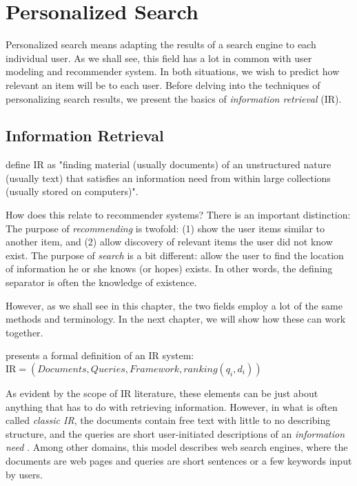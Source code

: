 \section{Personalized Search}
\label{sec:search}

Personalized search means adapting the results of a search engine to each individual user.
As we shall see, this field has a lot in common with user modeling and recommender system.
In both situations, we wish to predict how relevant an item will be to each user.
Before delving into the techniques of personalizing search results, we present 
the basics of \emph{information retrieval} (IR).

\subsection{Information Retrieval}

\citet[p1]{Manning2008} define IR as "finding material (usually documents) of
an unstructured nature (usually text) that satisfies an information need
from within large collections (usually stored on computers)".

How does this relate to recommender systems? There is an important distinction:
The purpose of \emph{recommending} is twofold: (1) show the user items
similar to another item, and (2) allow discovery of relevant items the user did not know exist.
The purpose of \emph{search} is a bit different: allow the user to find the location of
information he or she knows (or hopes) exists.
In other words, the defining separator is often the knowledge of existence.

However, as we shall see in this chapter, the two fields employ a lot of the same
methods and terminology. In the next chapter, we will show how these can work together.

\citet[p23]{Baeza-Yates1999} presents a formal definition of an IR system:
$\mathrm{IR} = (Documents, Queries, Framework, ranking(q_i, d_i))$

As evident by the scope of IR literature, these elements can be just about anything
that has to do with retrieving information. However, in what is often called
\emph{classic IR}, the documents contain free text with little to no describing structure,
and the queries are short user-initiated descriptions of an \emph{information need} \citep[p19]{Baeza-Yates1999}. 
Among other domains, this model describes web search engines, where the documents are web pages and
queries are short sentences or a few keywords input by users.


